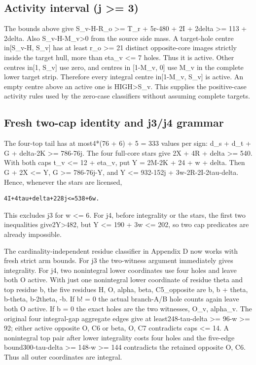 \documentclass[11pt,a4paper]{article}
\begin{document}
\hypertarget{activity-interval-j-3}{%
\subsection{Activity interval (j \textgreater=
3)}\label{activity-interval-j-3}}

The bounds above give S\_v-H-R\_o \textgreater= T\_r + 5r-480 + 2I +
2delta \textgreater= 113 + 2delta. Also S\_v-H-M\_v\textgreater0 from
the source side mass. A target-hole centre in{[}S\_v-H, S\_v{]} has at
least r\_o \textgreater= 21 distinct opposite-core images strictly
inside the target hull, more than eta\_v \textless= 7 holes. Thus it is
active. Other centres in{[}1, S\_v{]} use zero, and centres in
{[}1-M\_v, 0{]} use M\_v in the complete lower target strip. Therefore
every integral centre in{[}1-M\_v, S\_v{]} is active. An empty centre
above an active one is HIGH\textgreater S\_v. This supplies the
positive-case activity rules used by the zero-case classifiers without
assuming complete targets.

\hypertarget{fresh-two-cap-identity-and-j3j4-grammar}{%
\subsection{Fresh two-cap identity and j3/j4
grammar}\label{fresh-two-cap-identity-and-j3j4-grammar}}

The four-top tail has at most4*(76 + 6) + 5 = 333 values per sign: d\_s
+ d\_t + G + delta-2K \textgreater= 786-76j. The four full-core stars
give 2X + 4R + delta \textgreater= 540. With both caps t\_v \textless=
12 + eta\_v, put Y = 2M-2K + 24 + w + delta. Then G + 2X \textless= Y, G
\textgreater= 786-76j-Y, and Y \textless= 932-152j +
3w-2R-2I-2tau-delta. Hence, whenever the stars are licensed,

\begin{verbatim}
4I+4tau+delta+228j<=538+6w.
\end{verbatim}

This excludes j3 for w \textless= 6. For j4, before integrality or the
stars, the first two inequalities give2Y\textgreater482, but Y
\textless= 190 + 3w \textless= 202, so two cap predicates are already
impossible.

The cardinality-independent residue classifier in Appendix D now works
with fresh strict arm bounds. For j3 the two-witness argument
immediately gives integrality. For j4, two nonintegral lower coordinates
use four holes and leave both O active. With just one nonintegral lower
coordinate of residue theta and top residue b, the five residues H, O,
alpha, beta, C5\_opposite are b, b + theta, b-theta, b-2theta, -b. If b!
= 0 the actual branch-A/B hole counts again leave both O active. If b =
0 the exact holes are the two witnesses, O\_v, alpha\_v. The original
four integral-gap aggregate edges give at least248-tau-delta
\textgreater= 96-w \textgreater= 92; either active opposite O, C6 or
beta, O, C7 contradicts caps \textless= 14. A nonintegral top pair after
lower integrality costs four holes and the five-edge bound300-tau-delta
\textgreater= 148-w \textgreater= 144 contradicts the retained opposite
O, C6. Thus all outer coordinates are integral.
\end{document}
